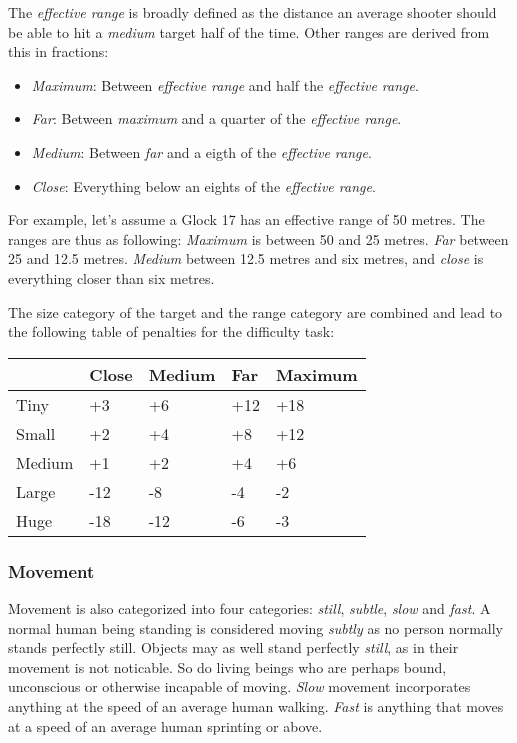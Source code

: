 The \emph{effective range} is broadly defined as the distance an average shooter
should be able to hit a \emph{medium} target half of the time. Other ranges are
derived from this in fractions:

\begin{itemize}
\item \emph{Maximum}: Between \emph{effective range} and half the
  \emph{effective range}.
\item \emph{Far}: Between \emph{maximum} and a quarter of the
  \emph{effective range}.
\item \emph{Medium}: Between \emph{far} and a eigth of the
  \emph{effective range}.
\item \emph{Close}: Everything below an eights of the \emph{effective range}.
\end{itemize}

For example, let's assume a Glock 17 has an effective range of 50
metres. The ranges are thus as following: \emph{Maximum} is between 50
and 25 metres. \emph{Far} between 25 and 12.5 metres. \emph{Medium}
between 12.5 metres and six metres, and \emph{close} is everything
closer than six metres.

The size category of the target and the range category are combined and lead
to the following table of penalties for the difficulty task:

\begin{center}
  \begin{tabular}{| l | l | l | l | l |}
    \hline
    \,        & Close & Medium & Far & Maximum \\ \hline
    Tiny      & +3    & +6     & +12 & +18    \\ \hline
    Small     & +2    & +4     & +8  & +12    \\ \hline
    Medium    & +1    & +2     & +4  & +6     \\ \hline
    Large     & -12   & -8     & -4  & -2     \\ \hline
    Huge      & -18   & -12    & -6  & -3     \\
    \hline
  \end{tabular}
\end{center}

\subsubsection{Movement}
\label{subs:6-Movement}

Movement is also categorized into four categories: \emph{still}, \emph{subtle},
\emph{slow} and \emph{fast}. A normal human being standing is considered
moving \emph{subtly} as no person normally stands perfectly still. Objects
may as well stand perfectly \emph{still}, as in their movement is not
noticable. So do living beings who are perhaps bound, unconscious or otherwise
incapable of moving. \emph{Slow} movement incorporates anything at the speed
of an average human walking. \emph{Fast} is anything that moves at a speed of
an average human sprinting or above.

